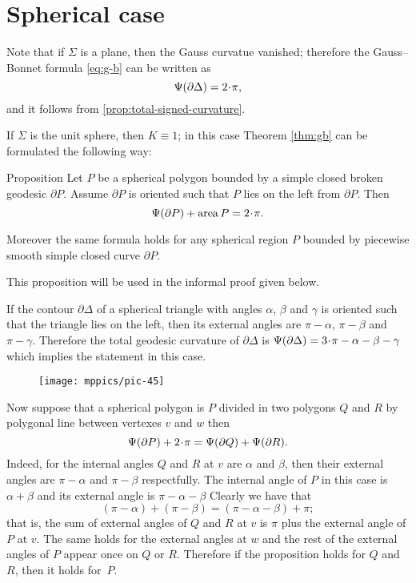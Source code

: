 \section*{Spherical case}

Note that if $\Sigma$ is a plane, then the Gauss curvatue vanished;
therefore the Gauss--Bonnet formula \ref{eq:g-b} can be written as 
\[\tgc{\partial\Delta}=2\cdot \pi,\]
and it follows from \ref{prop:total-signed-curvature}.

If $\Sigma$ is the unit sphere, then $K\equiv1$;
in this case Theorem \ref{thm:gb} can be formulated the following way:

\begin{thm}{Proposition}\label{prop:area-of-spher-polygon}
Let $P$ be a spherical polygon bounded by a simple closed broken geodesic $\partial P$.
Assume $\partial P$ is oriented such that $P$ lies on the left from $\partial P$.
Then 
\[\tgc{\partial P}+\area P=2\cdot \pi.\]

Moreover the same formula holds for any spherical region $P$ bounded by piecewise smooth simple closed curve $\partial P$.
\end{thm}

This proposition will be used in the informal proof given below.

If the contour $\partial\Delta$ of a spherical triangle with angles $\alpha$, $\beta$ and $\gamma$ is oriented such that the triangle lies on the left, then its external angles are  $\pi-\alpha$, $\pi-\beta$ and $\pi-\gamma$.
Therefore the total geodesic curvature of $\partial\Delta$ is $\tgc{\partial\Delta}=3\cdot\pi-\alpha-\beta-\gamma$
which implies the statement in this case.

\begin{wrapfigure}{o}{42 mm}
\vskip-0mm
\centering
\texttt{[image: mppics/pic-45]}
\vskip-0mm
\end{wrapfigure}

Now suppose that a spherical polygon is $P$ divided in two polygons $Q$ and $R$ by polygonal line between vertexes $v$ and $w$
then 
\[\tgc{\partial P}+2\cdot\pi =\tgc{\partial Q}+\tgc{\partial R}.\]
Indeed, for the internal angles $Q$ and $R$ at $v$ are $\alpha$ and $\beta$,
then their external angles are $\pi-\alpha$ and $\pi-\beta$ respectfully.
The internal angle of $P$ in this case is $\alpha+\beta$ and its external angle is $\pi-\alpha-\beta$
Clearly we have that 
\[(\pi-\alpha)+(\pi-\beta)=(\pi-\alpha-\beta)+\pi;\]
that is, the sum of external angles of $Q$ and $R$ at $v$ is $\pi$ plus the external angle of $P$ at $v$. 
The same holds for the external angles at $w$ and the rest of the external angles of $P$ appear once on $Q$ or $R$.
Therefore if the proposition holds for $Q$ and $R$,
then it holds for~$P$.

